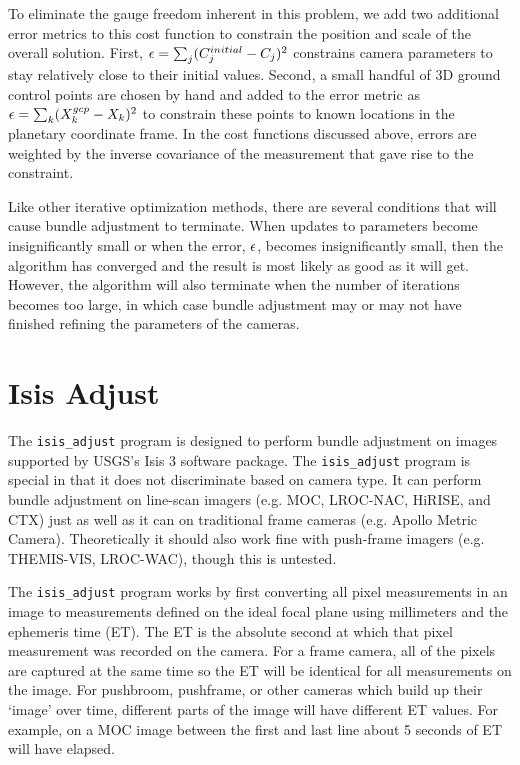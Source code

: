 To eliminate the gauge freedom inherent in this problem, we add two
additional error metrics to this cost function to constrain the position
and scale of the overall solution. First, ${\bf \epsilon} =
\sum_j(C_j^{initial}-C_j)^2$ constrains camera parameters to stay
relatively close to their initial values.  Second, a small handful of
3D ground control points are chosen by hand and added to the
error metric as ${\bf \epsilon} = \sum_k(X_k^{gcp}-X_k)^2$ to
constrain these points to known locations in the planetary coordinate
frame.  In the cost functions discussed above, errors are weighted by
the inverse covariance of the measurement that gave rise to the
constraint.

Like other iterative optimization methods, there are several
conditions that will cause bundle adjustment to terminate.  When
updates to parameters become insignificantly small or when the error,
${\bf \epsilon}$, becomes insignificantly small, then the algorithm
has converged and the result is most likely as good as it will get.
However, the algorithm will also terminate when the number of
iterations becomes too large, in which case bundle adjustment may or
may not have finished refining the parameters of the cameras.

\section{Isis Adjust}

The \texttt{isis\_adjust} program is designed to perform bundle
adjustment on images supported by USGS's Isis 3 software package.
The \texttt{isis\_adjust} program is special in that it does not
discriminate based on camera type. It can perform bundle adjustment
on line-scan imagers (e.g. MOC, LROC-NAC, HiRISE, and CTX) just
as well as it can on traditional frame cameras (e.g. Apollo
Metric Camera).  Theoretically it should also work fine with
push-frame imagers (e.g. THEMIS-VIS, LROC-WAC), though this is untested.

The \texttt{isis\_adjust} program works by first converting all
pixel measurements in an image to measurements defined on the ideal
focal plane using millimeters and the ephemeris time (ET). The ET
is the absolute second at which that pixel measurement was recorded
on the camera.  For a frame camera, all of the pixels are captured
at the same time so the ET will be identical for all measurements
on the image.  For pushbroom, pushframe, or other cameras which
build up their `image' over time, different parts of the image will
have different ET values.  For example, on a MOC image between the
first and last line about 5 seconds of ET will have elapsed.

